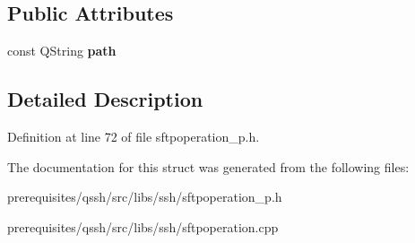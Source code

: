 \subsection*{Public Attributes}
\begin{DoxyCompactItemize}
\item 
\mbox{\label{struct_q_ssh_1_1_internal_1_1_sftp_stat_file_aa069f0a2a40144568e73e120e52d8748}} 
const Q\+String {\bfseries path}
\end{DoxyCompactItemize}


\subsection{Detailed Description}


Definition at line 72 of file sftpoperation\+\_\+p.\+h.



The documentation for this struct was generated from the following files\+:\begin{DoxyCompactItemize}
\item 
prerequisites/qssh/src/libs/ssh/sftpoperation\+\_\+p.\+h\item 
prerequisites/qssh/src/libs/ssh/sftpoperation.\+cpp\end{DoxyCompactItemize}
